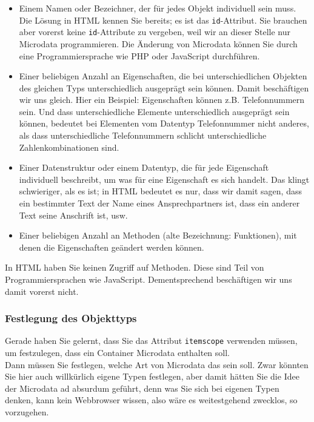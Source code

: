 \begin{itemize}
	\item Einem Namen oder Bezeichner, der für jedes Objekt individuell sein muss.\\
	Die Lösung in HTML kennen Sie bereits; es ist das \verb|id|-Attribut. Sie brauchen aber vorerst keine \verb|id|-Attribute zu vergeben, weil wir an dieser Stelle nur Microdata programmieren. Die Änderung von Microdata können Sie durch eine Programmiersprache wie PHP oder JavaScript durchführen.

	\item Einer beliebigen Anzahl an Eigenschaften, die bei unterschiedlichen Objekten des gleichen Typs unterschiedlich ausgeprägt sein können.
	Damit beschäftigen wir uns gleich. Hier ein Beispiel: Eigenschaften können z.B. Telefonnummern sein. Und dass unterschiedliche Elemente unterschiedlich ausgeprägt sein können, bedeutet bei Elementen vom Datentyp Telefonnummer nicht anderes, als dass unterschiedliche Telefonnummern schlicht unterschiedliche Zahlenkombinationen sind.

	\item Einer Datenstruktur oder einem Datentyp, die für jede Eigenschaft individuell beschreibt, um was für eine Eigenschaft es sich handelt.
	Das klingt schwieriger, als es ist; in HTML bedeutet es nur, dass wir damit sagen, dass ein bestimmter Text der Name eines Ansprechpartners ist, dass ein anderer Text seine Anschrift ist, usw.

	\item Einer beliebigen Anzahl an Methoden (alte Bezeichnung: Funktionen), mit denen die Eigenschaften geändert werden können.
\end{itemize}

In HTML haben Sie keinen Zugriff auf Methoden. Diese sind Teil von Programmiersprachen wie JavaScript. Dementsprechend beschäftigen wir uns damit vorerst nicht.

\subsubsection{Festlegung des Objekttyps}

Gerade haben Sie gelernt, dass Sie das Attribut \verb|itemscope| verwenden müssen, um festzulegen, dass ein Container Microdata enthalten soll.\\

Dann müssen Sie festlegen, welche Art von Microdata das sein soll. Zwar könnten Sie hier auch willkürlich eigene Typen festlegen, aber damit hätten Sie die Idee der Microdata ad absurdum geführt, denn was Sie sich bei eigenen Typen denken, kann kein Webbrowser wissen, also wäre es weitestgehend zwecklos, so vorzugehen.\\

